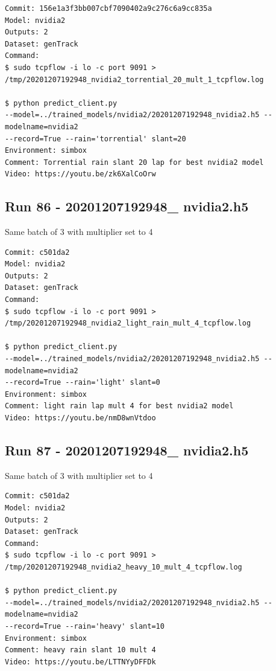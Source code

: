 \begin{verbatim}
Commit: 156e1a3f3bb007cbf7090402a9c276c6a9cc835a
Model: nvidia2 
Outputs: 2
Dataset: genTrack
Command:
$ sudo tcpflow -i lo -c port 9091 > 
/tmp/20201207192948_nvidia2_torrential_20_mult_1_tcpflow.log

$ python predict_client.py
--model=../trained_models/nvidia2/20201207192948_nvidia2.h5 --modelname=nvidia2 
--record=True --rain='torrential' slant=20
Environment: simbox
Comment: Torrential rain slant 20 lap for best nvidia2 model
Video: https://youtu.be/zk6XalCoOrw
\end{verbatim}

\subsection{Run 86 - 20201207192948\_ nvidia2.h5 }
Same batch of 3 with multiplier set to 4
\label{app_res:86}
\begin{verbatim}
Commit: c501da2
Model: nvidia2 
Outputs: 2
Dataset: genTrack
Command:
$ sudo tcpflow -i lo -c port 9091 > 
/tmp/20201207192948_nvidia2_light_rain_mult_4_tcpflow.log

$ python predict_client.py
--model=../trained_models/nvidia2/20201207192948_nvidia2.h5 --modelname=nvidia2 
--record=True --rain='light' slant=0
Environment: simbox
Comment: light rain lap mult 4 for best nvidia2 model
Video: https://youtu.be/nmD8wnVtdoo
\end{verbatim}

\subsection{Run 87 - 20201207192948\_ nvidia2.h5 }
Same batch of 3 with multiplier set to 4
\label{app_res:87}
\begin{verbatim}
Commit: c501da2
Model: nvidia2 
Outputs: 2
Dataset: genTrack
Command:
$ sudo tcpflow -i lo -c port 9091 > 
/tmp/20201207192948_nvidia2_heavy_10_mult_4_tcpflow.log

$ python predict_client.py
--model=../trained_models/nvidia2/20201207192948_nvidia2.h5 --modelname=nvidia2 
--record=True --rain='heavy' slant=10
Environment: simbox
Comment: heavy rain slant 10 mult 4
Video: https://youtu.be/LTTNYyDFFDk
\end{verbatim}

